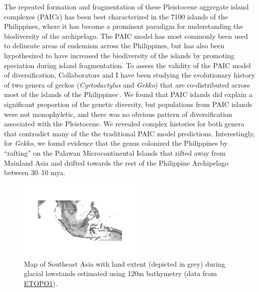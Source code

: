 \documentclass[10pt]{article}
\newcommand{\super}[1]{\ensuremath{^{\textrm{#1}}}}
\begin{document}
The repeated formation and fragmentation of these Pleistocene aggregate island complexes (PAICs) has been best characterized in the 7100\+ islands of the Philippines, where it has become a prominent paradigm for understanding the biodiversity of the archipelago.
The PAIC model has most commonly been used to delineate areas of endemism across the Philippines, but has also been hypothesized to have increased the biodiversity of the islands by promoting speciation during island fragmentation.
To assess the validity of the PAIC model of diversification, Collaborators and I have been studying the evolutionary history of two genera of geckos (\emph{Cyrtodactylus} and \emph{Gekko}) that are co-distributed across most of the islands of the Philippines\cite{Siler2010}\super{,}\cite{Siler2012}.
We found that PAIC islands did explain a significant proportion of the genetic diversity, but populations from PAIC islands were not monophyletic, and there was no obvious pattern of diversification associated with the Pleistocene.
We revealed complex histories for both genera that contradict many of the the traditional PAIC model predictions.
Interestingly, for \emph{Gekko}, we found evidence that the genus colonized the Philippines by ``rafting'' on the Palawan Microcontinental Islands that rifted away from Mainland Asia and drifted towards the rest of the Philippine Archipelago between 30--10 mya.

\begin{figure}
  \vspace{-1.5em}
  \begin{center}
    \includegraphics[width=0.53\textwidth]{sunda_shelf_small.pdf}
  \end{center}
  \vspace{-0.2em}
  \caption{Map of Southeast Asia with land extent (depicted in grey) during glacial lowstands estimated using 120m bathymetry (data from \href{http://ngdc.noaa.gov/mgg/global/global.html}{ETOPO1}).}
  \label{map}
  \vspace{-1.1em}
\end{figure}
\end{document}
